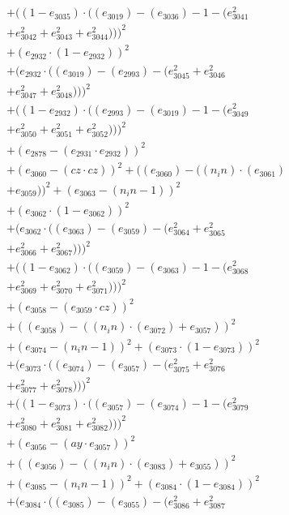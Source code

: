 \documentclass[10pt, a4paper]{article}
\begin{document}
\begin{align*}
& + ((1 - e_{3035})  \cdot  ((e_{3019}) - (e_{3036}) - 1 - (e_{3041}^{2} \\
& + e_{3042}^{2} + e_{3043}^{2} + e_{3044}^{2})))^{2} \\
& + (e_{2932}  \cdot  (1 - e_{2932}))^{2} \\
& + (e_{2932}  \cdot  ((e_{3019}) - (e_{2993}) - (e_{3045}^{2} + e_{3046}^{2} \\
& + e_{3047}^{2} + e_{3048}^{2})))^{2} \\
& + ((1 - e_{2932})  \cdot  ((e_{2993}) - (e_{3019}) - 1 - (e_{3049}^{2} \\
& + e_{3050}^{2} + e_{3051}^{2} + e_{3052}^{2})))^{2} \\
& + (e_{2878} - (e_{2931}  \cdot  e_{2932}))^{2} \\
& + (e_{3060} - (cz  \cdot  cz))^{2} + ((e_{3060}) - ((n_in)  \cdot  (e_{3061}) \\
& + e_{3059}))^{2} + (e_{3063} - (n_in - 1))^{2} \\
& + (e_{3062}  \cdot  (1 - e_{3062}))^{2} \\
& + (e_{3062}  \cdot  ((e_{3063}) - (e_{3059}) - (e_{3064}^{2} + e_{3065}^{2} \\
& + e_{3066}^{2} + e_{3067}^{2})))^{2} \\
& + ((1 - e_{3062})  \cdot  ((e_{3059}) - (e_{3063}) - 1 - (e_{3068}^{2} \\
& + e_{3069}^{2} + e_{3070}^{2} + e_{3071}^{2})))^{2} \\
& + (e_{3058} - (e_{3059}  \cdot  cz))^{2} \\
& + ((e_{3058}) - ((n_in)  \cdot  (e_{3072}) + e_{3057}))^{2} \\
& + (e_{3074} - (n_in - 1))^{2} + (e_{3073}  \cdot  (1 - e_{3073}))^{2} \\
& + (e_{3073}  \cdot  ((e_{3074}) - (e_{3057}) - (e_{3075}^{2} + e_{3076}^{2} \\
& + e_{3077}^{2} + e_{3078}^{2})))^{2} \\
& + ((1 - e_{3073})  \cdot  ((e_{3057}) - (e_{3074}) - 1 - (e_{3079}^{2} \\
& + e_{3080}^{2} + e_{3081}^{2} + e_{3082}^{2})))^{2} \\
& + (e_{3056} - (ay  \cdot  e_{3057}))^{2} \\
& + ((e_{3056}) - ((n_in)  \cdot  (e_{3083}) + e_{3055}))^{2} \\
& + (e_{3085} - (n_in - 1))^{2} + (e_{3084}  \cdot  (1 - e_{3084}))^{2} \\
& + (e_{3084}  \cdot  ((e_{3085}) - (e_{3055}) - (e_{3086}^{2} + e_{3087}^{2} \\

\end{align*}
\end{document}

